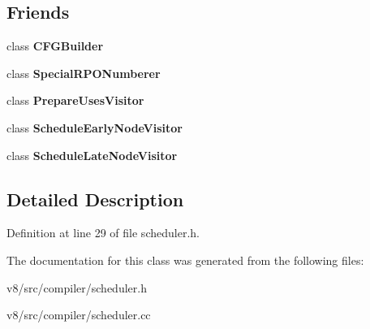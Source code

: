 \subsection*{Friends}
\begin{DoxyCompactItemize}
\item 
\mbox{\label{classv8_1_1internal_1_1compiler_1_1Scheduler_a651ba68d55963fc2c72f63d3d9dc8d35}} 
class {\bfseries C\+F\+G\+Builder}
\item 
\mbox{\label{classv8_1_1internal_1_1compiler_1_1Scheduler_a70b85df8387fa930fde2fb246ee98b9c}} 
class {\bfseries Special\+R\+P\+O\+Numberer}
\item 
\mbox{\label{classv8_1_1internal_1_1compiler_1_1Scheduler_ac92a424aa5c252752d4dc917d9d2047b}} 
class {\bfseries Prepare\+Uses\+Visitor}
\item 
\mbox{\label{classv8_1_1internal_1_1compiler_1_1Scheduler_a95c07d0ec2448034d53b1b8746fd092c}} 
class {\bfseries Schedule\+Early\+Node\+Visitor}
\item 
\mbox{\label{classv8_1_1internal_1_1compiler_1_1Scheduler_a1323738e293e91819df22cb24f986016}} 
class {\bfseries Schedule\+Late\+Node\+Visitor}
\end{DoxyCompactItemize}


\subsection{Detailed Description}


Definition at line 29 of file scheduler.\+h.



The documentation for this class was generated from the following files\+:\begin{DoxyCompactItemize}
\item 
v8/src/compiler/scheduler.\+h\item 
v8/src/compiler/scheduler.\+cc\end{DoxyCompactItemize}
